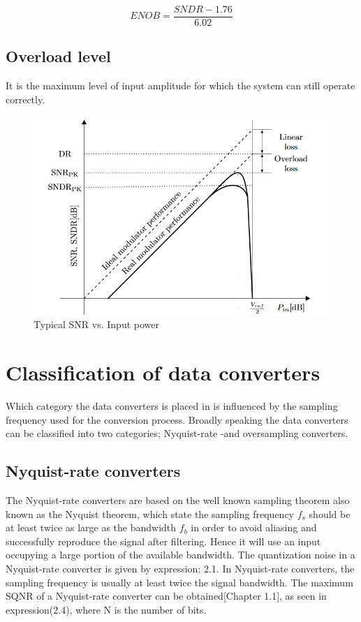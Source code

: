 \begin{equation}
    ENOB = \frac{SNDR - 1.76}{6.02}
\end{equation}

\subsection{Overload level}
It is the maximum level of input amplitude for which the system can still operate correctly. 
\begin{figure}[ht]
\centering
\includegraphics[scale=0.5]{images/metrics_snr.png}
\caption{Typical SNR vs. Input power}
\label{fig:metrics}
\end{figure}

\section{Classification of data converters}
Which category the data converters is placed in is influenced by the sampling frequency used for the conversion process. Broadly speaking the data converters can be classified into two categories; Nyquist-rate -and oversampling converters\cite{Ovi}.  

\subsection{Nyquist-rate converters}
The Nyquist-rate converters are based on the well known sampling theorem also known as the Nyquist theorem, which state the sampling frequency $f_s$ should be at least twice as large as the bandwidth $f_b$ in order to avoid aliasing and successfully reproduce the signal after filtering. Hence it will use an input occupying a large portion of the available bandwidth. The quantization noise in a Nyquist-rate converter is given by expression: 2.1. In Nyquist-rate converters, the sampling frequency is usually at least twice the signal bandwidth. The maximum SQNR of a Nyquist-rate converter can be obtained\cite{Richard}[Chapter 1.1], as seen in expression(2.4), where N is the number of bits.

